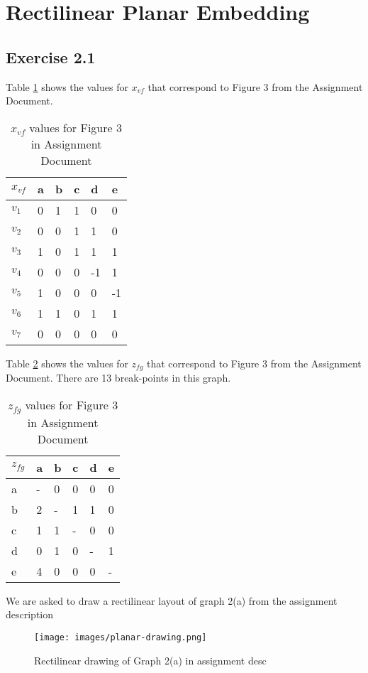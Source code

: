 \section{Rectilinear Planar Embedding}

\subsection{Exercise 2.1}

Table \ref{tab:Xvf} shows the values for {\(x_{vf}\)} that correspond to Figure 3 from the Assignment Document.

\begin{table}[h]
  \centering
  \begin{tabular}{l | l l l l l}
  \(x_{vf}\) & a & b & c & d  & e  \\
  \hline
  \(v_{1}\)  & 0 & 1 & 1 & 0  & 0  \\
  \(v_{2}\)  & 0 & 0 & 1 & 1  & 0  \\
  \(v_{3}\)  & 1 & 0 & 1 & 1  & 1  \\
  \(v_{4}\)  & 0 & 0 & 0 & -1 & 1  \\
  \(v_{5}\)  & 1 & 0 & 0 & 0  & -1 \\
  \(v_{6}\)  & 1 & 1 & 0 & 1  & 1  \\
  \(v_{7}\)  & 0 & 0 & 0 & 0  & 0
  \end{tabular}
  \caption{\(x_{vf}\) values for Figure 3 in Assignment Document}
  \label{tab:Xvf}
\end{table}


Table \ref{tab:Zvf} shows the values for \(z_{fg}\) that correspond to Figure 3 from the Assignment Document. There are 13 break-points in this graph.
\begin{table}[h]
  \centering
  \begin{tabular}{l|lllll}
  \(z_{fg}\) & a & b & c & d & e \\\hline
  a     & - & 0 & 0 & 0 & 0 \\
  b     & 2 & - & 1 & 1 & 0 \\
  c     & 1 & 1 & - & 0 & 0 \\
  d     & 0 & 1 & 0 & - & 1 \\
  e     & 4 & 0 & 0 & 0 & - \\
  \end{tabular}
  \caption{\(z_{fg}\) values for Figure 3 in Assignment Document}
  \label{tab:Zvf}
\end{table}

We are asked to draw a rectilinear layout of graph 2(a) from the assignment description
\begin{figure}[ht]
  \centering
  \texttt{[image: images/planar-drawing.png]}
  \caption{Rectilinear drawing of Graph 2(a) in assignment desc}
  \label{fig:rectidraw}
\end{figure}

